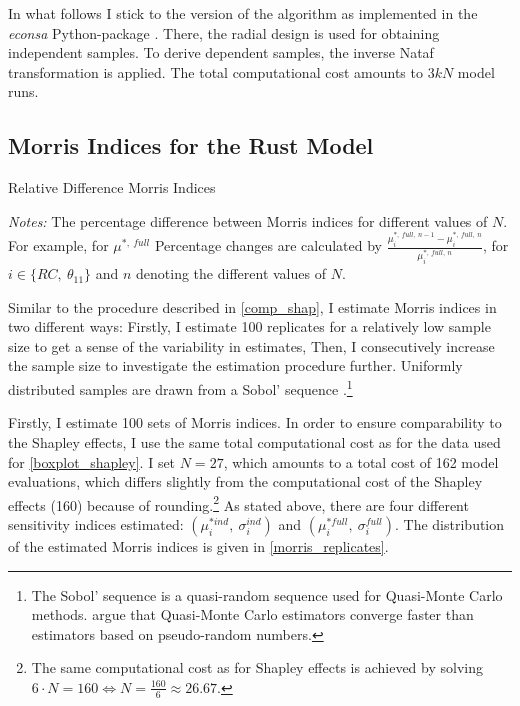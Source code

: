 In what follows I stick to the version of the algorithm as implemented in the \textit{econsa} Python-package \citep{OSE21}. There, the radial design is used for obtaining independent samples. To derive dependent samples, the inverse Nataf transformation is applied. The total computational cost amounts to $3kN$ model runs.

\subsection{Morris Indices for the Rust Model} \label{morris_rust_model}

\begin{table}[t]
    \caption{Relative Difference Morris Indices}
    \label{rel_diff_morris}
    \centering

    \begin{threeparttable}
        \begin{centering}
            
            \begin{tablenotes}
                \small
                \item \textit{Notes:} The percentage difference between Morris indices for different values of $N$. For example, for $\mu^{\ast,\ full}$ Percentage changes are calculated by $\frac{\mu^{\ast,\ full,\ n-1}_i - \mu^{\ast,\ full,\ n}_i}{\mu^{\ast,\ full,\ n}_i}$, for $i \in \{RC,\ \theta_{11}\}$ and $n$ denoting the different values of $N$.
            \end{tablenotes}
        \end{centering}

        \end{threeparttable}
\end{table}

Similar to the procedure described in \cref{comp_shap}, I estimate Morris indices in two different ways: Firstly, I estimate 100 replicates for a relatively low sample size to get a sense of the variability in estimates, Then, I consecutively increase the sample size to investigate
the estimation procedure further. Uniformly distributed samples are drawn from a Sobol'
sequence \citep{S76}.\footnote{The Sobol' sequence is a quasi-random sequence used for Quasi-Monte Carlo methods. \citet{KTA12} argue that Quasi-Monte Carlo estimators converge faster than estimators based on pseudo-random numbers.}

Firstly, I estimate 100 sets of Morris indices. In order to ensure comparability to the Shapley effects, I use the same total computational cost as for the data used for \cref{boxplot_shapley}. I set $N = 27$, which amounts
to a total cost of 162 model evaluations, which differs slightly from the computational
cost of the Shapley effects (160) because of rounding.\footnote{The same computational cost as for Shapley effects is achieved by solving $6 \cdot N = 160 \Leftrightarrow N = \frac{160}{6} \approx 26.67$.} As stated above, there are four different
sensitivity indices estimated: $(\mu^{\ast ind}_i,\ \sigma_i^{ind})$ and $(\mu^{\ast full}_i,\ \sigma_i^{full})$. The distribution of the
estimated Morris indices is given in \cref{morris_replicates}.

